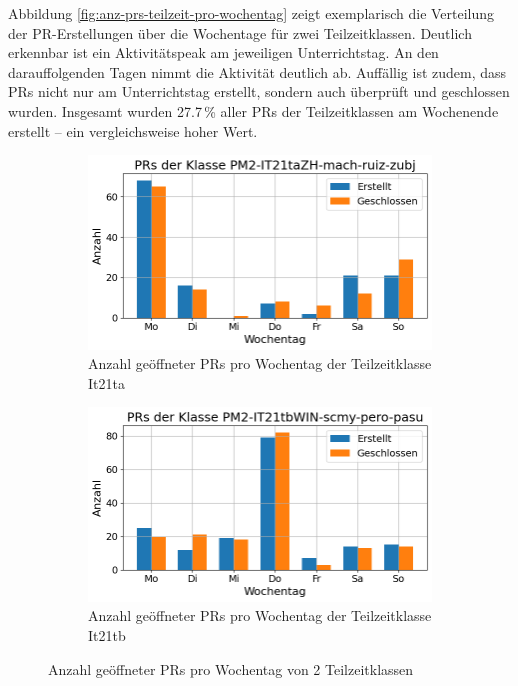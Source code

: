 Abbildung \autoref{fig:anz-prs-teilzeit-pro-wochentag} zeigt exemplarisch die Verteilung der PR-Erstellungen über die Wochentage für zwei Teilzeitklassen. Deutlich erkennbar ist ein Aktivitätspeak am jeweiligen Unterrichtstag. An den darauffolgenden Tagen nimmt die Aktivität deutlich ab. Auffällig ist zudem, dass PRs nicht nur am Unterrichtstag erstellt, sondern auch überprüft und geschlossen wurden. Insgesamt wurden 27.7\,\% aller PRs der Teilzeitklassen am Wochenende erstellt – ein vergleichsweise hoher Wert.

\begin{figure}[htbp]
    \centering
    \begin{subfigure}[b]{0.48\textwidth}
        \centering
        \includegraphics[width=\textwidth]{Figures/pr-klasse-per-wochentag-it21ta.png}
         \caption{Anzahl geöffneter PRs pro Wochentag der Teilzeitklasse It21ta}
        \label{fig:anzahl-prs-pro-wochentag-it21ta}
    \end{subfigure}
    \hfill
    \begin{subfigure}[b]{0.48\textwidth}
        \centering
        \includegraphics[width=\textwidth]{Figures/pr-klasse-per-wochentag-21tb.png}
         \caption{Anzahl geöffneter PRs pro Wochentag der Teilzeitklasse It21tb}
        \label{fig:anzahl-prs-pro-wochentag-it21tb}
    \end{subfigure}
    \caption{Anzahl geöffneter PRs pro Wochentag von 2 Teilzeitklassen}
    \label{fig:anz-prs-teilzeit-pro-wochentag}
\end{figure}

